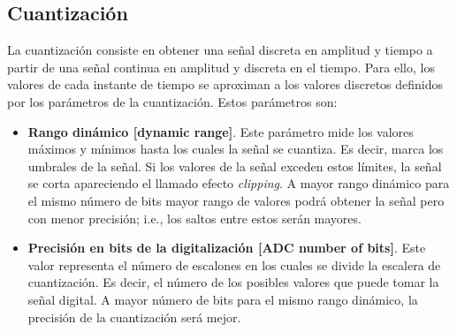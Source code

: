 \subsection{Cuantización}
La cuantización consiste en obtener una señal discreta en amplitud y tiempo a partir de una señal continua en amplitud y discreta en el tiempo. Para ello, los valores de cada instante de tiempo se aproximan a los valores discretos definidos por los parámetros de la cuantización. Estos parámetros son:
\begin{itemize}
	\item \textbf{Rango dinámico [dynamic range]}. Este parámetro mide los valores máximos y mínimos hasta los cuales la señal se cuantiza. Es decir, marca los umbrales de la señal. Si los valores de la señal exceden estos límites, la señal se corta apareciendo el llamado efecto \textit{clipping}. A mayor rango dinámico para el mismo número de bits mayor rango de valores podrá obtener la señal pero con menor precisión; i.e., los saltos entre estos serán mayores.
	\item \textbf{Precisión en bits de la digitalización [\gls{ADC} number of bits]}. Este valor representa el número de escalones en los cuales se divide la escalera de cuantización. Es decir, el número de los posibles valores que puede tomar la señal digital. A mayor número de bits para el mismo rango dinámico, la precisión de la cuantización será mejor.
\end{itemize}

